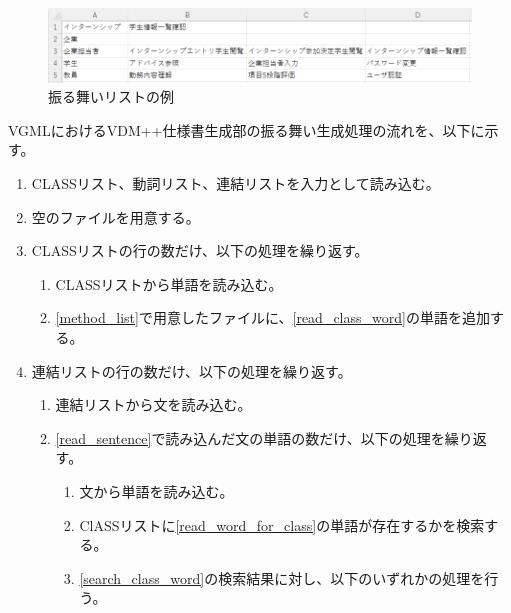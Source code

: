 \begin{figure}[t]
    \begin{center}
        \includegraphics[width=1.0\columnwidth]{image/method_list.png}
        \caption{振る舞いリストの例}
        \label{fig:method_list}
    \end{center}
\end{figure}

VGMLにおけるVDM++仕様書生成部の振る舞い生成処理の流れを、以下に示す。

\begin{enumerate}
    \item CLASSリスト、動詞リスト、連結リストを入力として読み込む。
    \item 空のファイルを用意する。
    \label{method_list}
    \item CLASSリストの行の数だけ、以下の処理を繰り返す。
        \begin{enumerate}
            \item CLASSリストから単語を読み込む。
            \label{read_class_word}
            \item \ref{method_list}で用意したファイルに、\ref{read_class_word}の単語を追加する。
        \end{enumerate}
    \item 連結リストの行の数だけ、以下の処理を繰り返す。
    \label{loop_connect_list}
        \begin{enumerate}
            \item 連結リストから文を読み込む。
            \label{read_sentence}
            \item \ref{read_sentence}で読み込んだ文の単語の数だけ、以下の処理を繰り返す。
            \label{loop_sentence}
                \begin{enumerate}
                    \item 文から単語を読み込む。
                    \label{read_word_for_class}
                    \item ClASSリストに\ref{read_word_for_class}の単語が存在するかを検索する。
                    \label{search_class_word}
                    \item \ref{search_class_word}の検索結果に対し、以下のいずれかの処理を行う。
                        \begin{itemize}

\end{itemize}
\end{enumerate}
\end{enumerate}
\end{enumerate}
